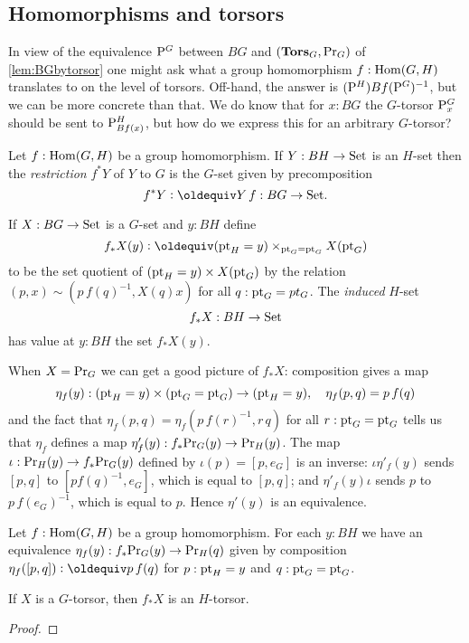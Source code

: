 \subsection{Homomorphisms and torsors}
\label{sec:homotor}
In view of the equivalence $\mathrm{P}_{}^G$ between $BG$ and $(\mathbf{Tors}_G,\mathrm{Pr}_{{G}})$ of \cref{lem:BGbytorsor} one might ask what a group homomorphism  $f:\mathrm{Hom}(G,H)$ translates to on the level of torsors.  Off-hand, the answer is $(\mathrm{P}_{}^H)Bf(\mathrm{P}_{}^G)^{-1}$, but we can be more concrete than that.  We do know that for $x:BG$ the $G$-torsor $\mathrm{P}_{x}^G$ should be sent to $\mathrm{P}_{Bf(x)}^H$, but how do we express this for an arbitrary $G$-torsor?
\begin{definition}
  \label{def:restrictandinduce}
  Let $f:\mathrm{Hom}(G,H)$ be a group homomorphism.  If $Y:BH\to\mathord{\mathrm{Set}}$ is an $H$-set then the \emph{restriction} $f^*Y$ of $Y$ to $G$ is the $G$-set given by precomposition 
$$f^*Y\defequi Y\, f:BG\to\Set.$$  

If $X:BG\to\mathord{\mathrm{Set}}$ is a $G$-set and $y:BH$ define 
$$f_*X(y)\defequi(\pt_H=y)\times_{\pt_G=\pt_G}X(\pt_G)$$ to be the set quotient of $({\mathord{\mathrm{pt}}}_H=y)\times X({\mathord{\mathrm{pt}}}_G)$ by the relation $(p,x)\sim(p\, f(q)^{-1},X(q)x)$ for all $q:{\mathord{\mathrm{pt}}}_G=pt_G$.  The \emph{induced} $H$-set 
$$f_*X:BH\to\mathord{\mathrm{Set}}$$ has value at $y:BH$ the set $f_*X(y)$.
\end{definition}
When $X=\mathrm{Pr}_{{G}}$ we can get a good picture of $f_*X$:  composition gives a map
$$\eta_f(y):({\mathord{\mathrm{pt}}}_H=y)\times ({\mathord{\mathrm{pt}}}_G={\mathord{\mathrm{pt}}}_G)\to ({\mathord{\mathrm{pt}}}_H=y),\quad \eta_f(p,q)=p\,f(q)$$
and the fact that $\eta_f(p,q)=\eta_f(p\,f(r)^{-1},r\,q)$ for all $r:{\mathord{\mathrm{pt}}}_G={\mathord{\mathrm{pt}}}_G$ tells us that $\eta_f$ defines a map $\eta'_f(y):f_*\mathrm{Pr}_{{G}}(y)\to\mathrm{Pr}_{{H}}(y)$.  
The map $\iota:\mathrm{Pr}_{{H}}(y)\to f_*\mathrm{Pr}_{{G}}(y)$ defined by $\iota(p)=[p,e_G]$ is an inverse: $\iota\eta'_f(y)$ sends $[p,q]$ to $[pf(q)^{-1},e_G]$, which is equal to $[p,q]$; and $\eta'_f(y)\iota$ sends $p$ to $p\,f(e_G)^{-1}$, which is equal to $p$.  Hence $\eta'(y)$ is an equivalence.
\begin{lemma}
  \label{lem:inducedtorsor}
   Let $f:\mathrm{Hom}(G,H)$ be a group homomorphism.  For each $y:BH$ we have an equivalence $\eta_f(y):f_*\mathrm{Pr}_{{G}}(y)\to\mathrm{Pr}_{{H}}(q)$ given by composition $\eta_f([p,q])\defequi p\, f(q)$ for $p:{\mathord{\mathrm{pt}}}_H=y$ and $q:{\mathord{\mathrm{pt}}}_G={\mathord{\mathrm{pt}}}_G$.

If $X$ is a $G$-torsor, then $f_*X$ is an $H$-torsor. 
\end{lemma}
\begin{proof}
  
\end{proof}


